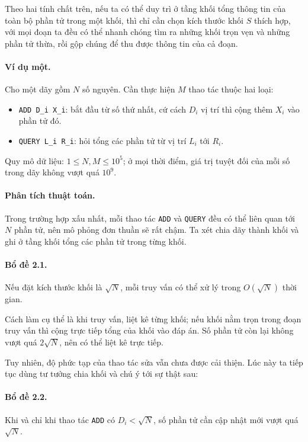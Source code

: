 \documentclass[11pt]{article}
\begin{document}
Theo hai tính chất trên, nếu ta có thể duy trì ở tầng khối tổng thông tin của
toàn bộ phần tử trong một khối, thì chỉ cần chọn kích thước khối \(S\) thích
hợp, với mọi đoạn ta đều có thể nhanh chóng tìm ra những khối trọn vẹn và
những phần tử thừa, rồi gộp chúng để thu được thông tin của cả đoạn.

\paragraph{Ví dụ một.}
Cho một dãy gồm \(N\) số nguyên. Cần thực hiện \(M\) thao tác thuộc hai loại:
\begin{itemize}
  \item \texttt{ADD D\_i X\_i}: bắt đầu từ số thứ nhất, cứ cách \(D_i\) vị
  trí thì cộng thêm \(X_i\) vào phần tử đó.
  \item \texttt{QUERY L\_i R\_i}: hỏi tổng các phần tử từ vị trí \(L_i\) tới
  \(R_i\).
\end{itemize}

Quy mô dữ liệu: \(1\le N,M\le 10^5\); ở mọi thời điểm, giá trị tuyệt đối của
mỗi số trong dãy không vượt quá \(10^9\).

\paragraph{Phân tích thuật toán.}
Trong trường hợp xấu nhất, mỗi thao tác \texttt{ADD} và \texttt{QUERY} đều
có thể liên quan tới \(N\) phần tử, nên mô phỏng đơn thuần sẽ rất chậm. Ta
xét chia dãy thành khối và ghi ở tầng khối tổng các phần tử trong từng khối.

\paragraph{Bổ đề 2.1.}
Nếu đặt kích thước khối là \(\sqrt N\), mỗi truy vấn có thể xử lý trong
\(O(\sqrt N)\) thời gian.

Cách làm cụ thể là khi truy vấn, liệt kê từng khối; nếu khối nằm trọn trong
đoạn truy vấn thì cộng trực tiếp tổng của khối vào đáp án. Số phần tử còn lại
không vượt quá \(2\sqrt N\), nên có thể liệt kê trực tiếp.

Tuy nhiên, độ phức tạp của thao tác sửa vẫn chưa được cải thiện. Lúc này ta
tiếp tục dùng tư tưởng chia khối và chú ý tới sự thật sau:

\paragraph{Bổ đề 2.2.}
Khi và chỉ khi thao tác \texttt{ADD} có \(D_i<\sqrt N\), số phần tử cần cập
nhật mới vượt quá \(\sqrt N\).
\end{document}
